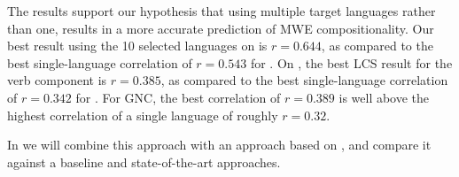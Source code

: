 \documentclass[output=paper
,modfonts
,nonflat]{langsci/langscibook}
\begin{document}

The results support our hypothesis that using multiple target
languages rather than one, results in a more accurate prediction of
MWE compositionality. Our best result using the 10 selected languages
on \REDDY is $r = 0.644$, as compared to the best single-language
correlation of $r = 0.543$ for . On \BANNARD, the best LCS result
for the verb component is $r = 0.385$, as compared to the best
single-language correlation of $r = 0.342$ for . For GNC, the best
correlation of $r = 0.389$ is well above the highest correlation of a single
language of roughly $r = 0.32$.

In  we will combine this 
approach with an approach based on , and
compare it against a baseline and state-of-the-art approaches.






\end{document}
